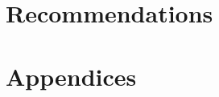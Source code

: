 \documentclass[amsmath, amssymb, aps, pra, 12pt]{revtex4-1}
\begin{document}
\section{\label{sec:recommendations}Recommendations}


\section{\label{sec:appendices}Appendices}



\end{document}
